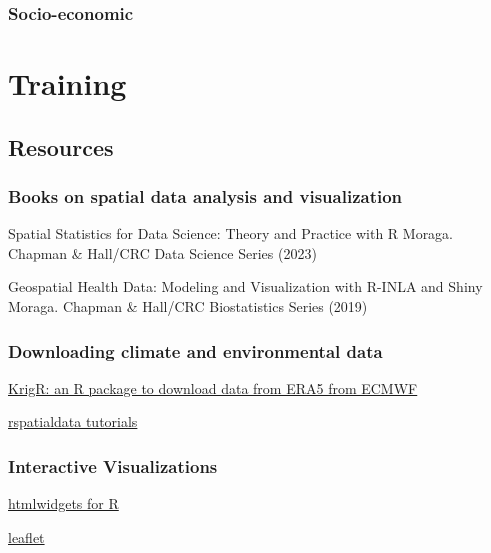 \documentclass[
  letterpaper,
  DIV=11,
  numbers=noendperiod]{scrreprt}
\begin{document}
\hypertarget{socio-economic-1}{%
\section{Socio-economic}\label{socio-economic-1}}

\part{Training}

\hypertarget{resources}{%
\chapter{Resources}\label{resources}}

\hypertarget{books-on-spatial-data-analysis-and-visualization}{%
\section{Books on spatial data analysis and
visualization}\label{books-on-spatial-data-analysis-and-visualization}}

Spatial Statistics for Data Science: Theory and Practice with R Moraga.
Chapman \& Hall/CRC Data Science Series (2023)

Geospatial Health Data: Modeling and Visualization with R-INLA and Shiny
Moraga. Chapman \& Hall/CRC Biostatistics Series (2019)

\hypertarget{downloading-climate-and-environmental-data}{%
\section{Downloading climate and environmental
data}\label{downloading-climate-and-environmental-data}}

\href{https://github.com/ErikKusch/KrigR}{KrigR: an R package to
download data from ERA5 from ECMWF}

\href{https://rspatialdata.github.io/index.html}{rspatialdata tutorials}

\hypertarget{interactive-visualizations}{%
\section{Interactive Visualizations}\label{interactive-visualizations}}

\href{https://www.htmlwidgets.org/}{htmlwidgets for R}

\href{https://rstudio.github.io/leaflet/}{leaflet}
\end{document}
